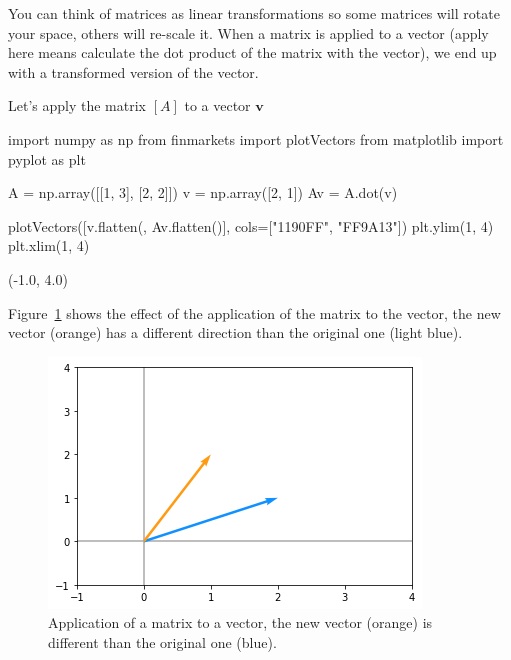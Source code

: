 You can think of matrices as linear transformations so some matrices will rotate your space, others will re-scale it. When a matrix is applied to a vector (apply here means calculate the dot product of the matrix with the vector), we end up with a transformed version of the vector.

Let's apply the matrix $[A]$ to a vector $\boldsymbol{v}$

\begin{ipython}
import numpy as np
from finmarkets import plotVectors
from matplotlib import pyplot as plt

A = np.array([[1, 3], [2, 2]])	
v = np.array([2, 1])
Av = A.dot(v)

plotVectors([v.flatten({}, Av.flatten()], cols=["1190FF", "FF9A13"])
plt.ylim(1, 4)
plt.xlim(1, 4)
\end{ipython}
\begin{ioutput}
(-1.0, 4.0)
\end{ioutput}

Figure~\ref{fig:matrix_as_transform} shows the effect of the application of the matrix to the vector, the new vector (orange) has a different direction than the original one (light blue).

\begin{figure}[htb]
	\centering
	\includegraphics[width=0.7\linewidth]{figures/matrix_transformation}
	\caption{Application of a matrix to a vector, the new vector (orange) is different than the original one (blue).}
	\label{fig:matrix_as_transform}
\end{figure}



